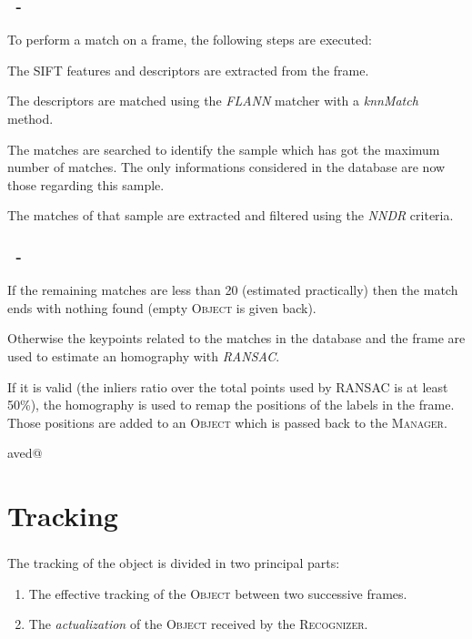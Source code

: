 \documentclass{beamer}
\makeatletter
\newenvironment{cenumerate}{
	\enumerate
	\setcounter{\@enumctr}{\csname saved@\@enumctr\endcsname}
}{
	\expandafter\xdef\csname saved@\@enumctr\endcsname{\the\value{\@enumctr}}
	\endenumerate
}
\newenvironment{cenumerate*}{
	\enumerate
}{
	\expandafter\xdef\csname saved@\@enumctr\endcsname{\the\value{\@enumctr}}
	\endenumerate
}
\makeatother
\begin{document}
	\begin{frame}
		\frametitle{\insertsection\ - \insertsubsection}
		To perform a match on a frame, the following steps are executed:
		\begin{cenumerate*}
			\item The SIFT features and descriptors are extracted from the frame.
			\item The descriptors are matched using the \emph{FLANN} matcher with
				a \emph{knnMatch} method.
			\item The matches are searched to identify the sample which has got 
				the maximum number of matches. The only informations considered in
				the database are now those regarding this sample.
			\item The matches of that sample are extracted and filtered using the
				\emph{NNDR} criteria.
		\end{cenumerate*}
	\end{frame}

	\begin{frame}
		\frametitle{\insertsection\ - \insertsubsection}
		\begin{cenumerate}
			\item If the remaining matches are less than 20 (estimated practically)
				then the match ends with nothing found (empty \textsc{Object} is given back).
			\item Otherwise the keypoints related to the matches in the database and the
				frame are used to estimate an homography with \emph{RANSAC}.
			\item If it is valid (the inliers ratio over the total points used by RANSAC is
				at least 50\%), the homography is used to remap the positions of the labels in
				the frame. Those positions are added to an \textsc{Object}
				which is passed back to the \textsc{Manager}.
		\end{cenumerate}
	\end{frame}

	\section{Tracking}

	\begin{frame}
		\frametitle{\insertsection}
		The tracking of the object is divided in two principal parts:
		\begin{enumerate}
			\item The effective tracking of the \textsc{Object} between two
				successive frames.
			\item The \emph{actualization} of the \textsc{Object} received by the
				\textsc{Recognizer}.
		\end{enumerate}
	\end{frame}
\end{document}
